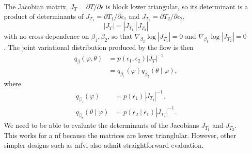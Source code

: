The Jacobian matrix, $J_{T}=\partial T/\partial\epsilon$ is block lower triangular, so its determinant
is a product of determinants of $J_{T_1} = \partial T_1/\partial \epsilon_1$ and $J_{T_2} = \partial T_2/\partial \epsilon_2$,
\begin{equation*}
  \left\vert J_T \right\vert = \left\vert J_{T_1} \right\vert \left\vert J_{T_2} \right\vert
\end{equation*}
with no cross dependence on $\beta_1,\beta_2$, so that $\nabla_{\beta_2} \log \left\vert J_{T_1} \right\vert =0$ and $\nabla_{\beta_1} \log \left\vert J_{T_2} \right\vert =0$.
The joint variational distribution produced by the flow is then
\begin{align*}
  q_{\beta}(\varphi, \theta) & = p(\epsilon_1, \epsilon_2) \left\vert J_T \right\vert ^{-1} \\
                             & =q_{\beta_1}(\varphi)q_{\beta_2}(\theta\mid \varphi),
\end{align*}
where
\begin{align}
  q_{\beta_1}(\varphi)            & = p(\epsilon_1) \left\vert J_{T_1} \right\vert ^{-1}, \label{eqn:q_lambda1_from_p_jacob}              \\
  q_{\beta_2}(\theta\mid \varphi) & =p(\epsilon_2\mid \epsilon_1) \left\vert J_{T_2} \right\vert ^{-1}.\label{eqn:q_lambda2_from_p_jacob}
\end{align}
We need to be able to evaluate the determinants of the Jacobians $J_{T_1}$ and $J_{T_2}$. This works for a \acrshort*{nf} because the matrices are lower trianglular. However, other simpler designs such as \acrshort*{mfvi} also admit straightforward evaluation.

